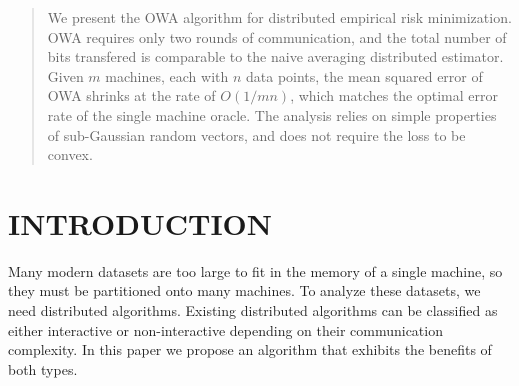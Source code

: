 \documentclass[twoside]{article}
\begin{document}
\begin{abstract}
We present the OWA algorithm for distributed empirical risk minimization.
OWA requires only two rounds of communication, and the total number of bits transfered is comparable to the naive averaging distributed estimator. 
Given $m$ machines, each with $n$ data points, 
the mean squared error of OWA shrinks at the rate of $O(1/mn)$, 
which matches the optimal error rate of the single machine oracle.
The analysis relies on simple properties of sub-Gaussian random vectors,
and does not require the loss to be convex.
\end{abstract}




\section{INTRODUCTION}

Many modern datasets are too large to fit in the memory of a single machine,
so they must be partitioned onto many machines.
To analyze these datasets, we need distributed algorithms.
Existing distributed algorithms can be classified as either interactive or non-interactive depending on their communication complexity.
In this paper we propose an algorithm that exhibits the benefits of both types.
\end{document}
